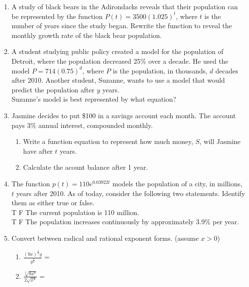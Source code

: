 \documentclass[12pt, twoside]{article}
\begin{document}
\begin{enumerate}[itemsep=0.5cm]
\newpage
\item A study of black bears in the Adirondacks reveals that their population can be represented by the function $P(t) = 3500(1.025)^t$, where $t$ is the number of years since the study began. Rewrite the function to reveal the monthly growth rate of the black bear population. %
\vspace{2cm}

\item A student studying public policy created a model for the population of Detroit, where the population decreased 25\% over a decade. He used the model $P = 714(0.75)^d$, where $P$ is the population, in thousands, $d$ decades after 2010. Another student, Suzanne, wants to use a model that would predict the population after $y$ years. \\[0.25cm]
Suzanne's model is best represented by what equation? \vspace{3cm}

\item Jasmine decides to put \$100 in a savings account each month. The account pays 3\% annual interest, compounded monthly. %
    \begin{enumerate}
        \item Write a function equation to represent how much money, $S$, will Jasmine have after $t$ years. \vspace{2cm}
        \item Calculate the acount balance after 1 year. \vspace{2cm}
    \end{enumerate}

\item The function $p(t) = 110e^{0.03922t}$ models the population of a city, in
millions, $t$ years after 2010. As of today, consider the following two
statements. Identify them as either true or false. \\[0.25cm]
T \; F \; The current population is 110 million. \\[0.25cm]
T \; F \; The population increases continuously by approximately
3.9\% per year. 

\newpage
\item Convert between radical and rational exponent forms. (assume $x > 0$)
    \begin{multicols}{2}
    \begin{enumerate}
        \item $\displaystyle \frac{(9x)^{\frac{1}{2}} y}{y^{\frac{1}{2}}} =$
        \item $\displaystyle \frac{\sqrt[3]{8x^8}}{2 \sqrt{x^4}} = $
    \end{enumerate}
    \end{multicols} \vspace{2cm}


\end{enumerate}
\end{document}
